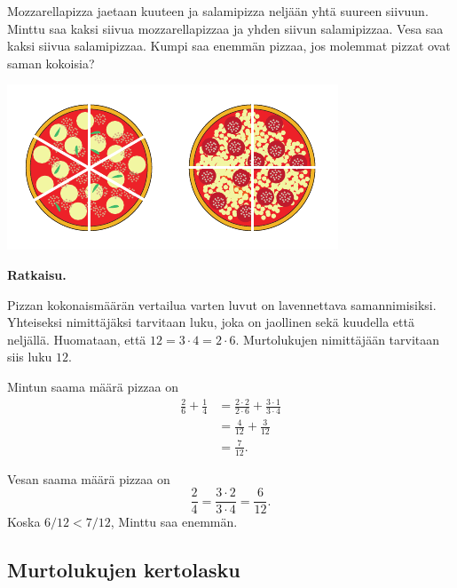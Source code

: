    
 \begin{esimerkki}
        Mozzarellapizza jaetaan kuuteen ja salamipizza neljään yhtä suureen
        siivuun. Minttu saa kaksi siivua mozzarellapizzaa ja yhden siivun salamipizzaa.
        Vesa saa kaksi siivua salamipizzaa. Kumpi saa enemmän pizzaa, jos
        molemmat pizzat ovat saman kokoisia?
        
        \begin{center}        
          \includegraphics[scale=1.0]{pictures/Kuva3-1-6-pizzat.pdf}
        \end{center}

        \textbf{Ratkaisu.}
        
        Pizzan kokonaismäärän vertailua varten luvut on lavennettava samannimisiksi.
        Yhteiseksi nimittäjäksi tarvitaan luku, joka on jaollinen sekä kuudella että neljällä.
        Huomataan, että $12 = 3\cdot 4 = 2\cdot 6$. Murtolukujen nimittäjään tarvitaan siis luku $12$.
        
        Mintun saama määrä pizzaa on
        \begin{align*}
           \frac{2}{6} + \frac{1}{4} &= \frac{2\cdot 2}{2\cdot 6} + \frac{3\cdot 1}{3\cdot 4} \\ 
	       							 &= \frac{4}{12}+\frac{3}{12} \\ 
	       							 &= \frac{7}{12}.
        \end{align*}
        
        Vesan saama määrä pizzaa on
        \[
            \frac{2}{4} =
            \frac{3\cdot 2}{3\cdot 4} =
            \frac{6}{12}.
        \]
        Koska $6/12 < 7/12$, Minttu saa enemmän.
    \end{esimerkki}

    
\subsection*{Murtolukujen kertolasku}
    
